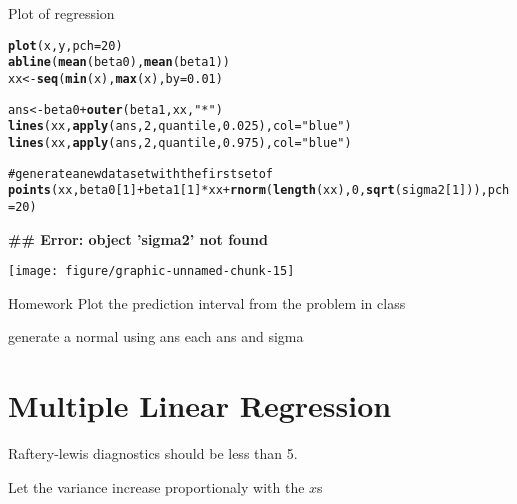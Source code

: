 \documentclass[12pt,letterpaper,oneside]{article}\usepackage{graphicx, color}
\makeatletter
\newcommand{\hlfunctioncall}[1]{\textcolor[rgb]{0.501960784313725,0,0.329411764705882}{\textbf{#1}}}%
\newcommand{\hlstring}[1]{\textcolor[rgb]{0.6,0.6,1}{#1}}%
\newcommand{\hlcomment}[1]{\textcolor[rgb]{0.180392156862745,0.6,0.341176470588235}{#1}}%
\newenvironment{kframe}{%
 \def\at@end@of@kframe{}%
 \ifinner\ifhmode%
  \def\at@end@of@kframe{\end{minipage}}%
  \begin{minipage}{\columnwidth}%
 \fi\fi%
 \def\FrameCommand##1{\hskip\@totalleftmargin \hskip-\fboxsep
 \colorbox{shadecolor}{##1}\hskip-\fboxsep
     \hskip-\linewidth \hskip-\@totalleftmargin \hskip\columnwidth}%
 \MakeFramed {\advance\hsize-\width
   \@totalleftmargin\z@ \linewidth\hsize
   \@setminipage}}%
 {\par\unskip\endMakeFramed%
 \at@end@of@kframe}
\newenvironment{knitrout}{}{} %
\newcommand{\dateTaken}{January 7, 2013}
\makeatother
\begin{document}
Plot of regression
\begin{knitrout}\scriptsize
{}\color{fgcolor}\begin{kframe}
\begin{alltt}
\hlfunctioncall{plot}(x, y, pch = 20)
\hlfunctioncall{abline}(\hlfunctioncall{mean}(beta0), \hlfunctioncall{mean}(beta1))
xx <- \hlfunctioncall{seq}(\hlfunctioncall{min}(x), \hlfunctioncall{max}(x), by = 0.01)

ans <- beta0 + \hlfunctioncall{outer}(beta1, xx, \hlstring{"*"})
\hlfunctioncall{lines}(xx, \hlfunctioncall{apply}(ans, 2, quantile, 0.025), col = \hlstring{"blue"})
\hlfunctioncall{lines}(xx, \hlfunctioncall{apply}(ans, 2, quantile, 0.975), col = \hlstring{"blue"})

\hlcomment{# generate a new data set with the first set of}
\hlfunctioncall{points}(xx, beta0[1] + beta1[1] * xx + \hlfunctioncall{rnorm}(\hlfunctioncall{length}(xx), 0, \hlfunctioncall{sqrt}(sigma2[1])), pch = 20)
\end{alltt}


{\ttfamily\noindent\bfseries\textcolor{errorcolor}{\#\# Error: object 'sigma2' not found}}\end{kframe}

{\centering \texttt{[image: figure/graphic-unnamed-chunk-15]} 

}



\end{knitrout}


Homework Plot the prediction interval from the problem in class

generate a normal using  ans each ans and sigma
\renewcommand{\dateTaken}{January 29, 2013}
\daysep
\section{Multiple Linear Regression} %
\label{sec:multiple_linear_regression}

Raftery-lewis diagnostics should be less than 5.

Let the variance increase proportionaly with the $x$s
\end{document}
